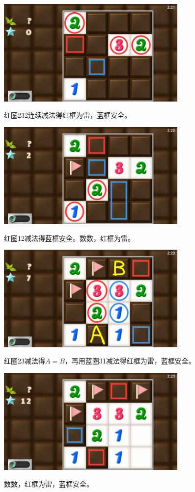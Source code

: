 \subsection{} %
\begin{center}
    \includegraphics[width=0.7\textwidth]{puzzle/145-1.png}
\end{center}
红圈232连续减法得红框为雷，蓝框安全。
\begin{center}
    \includegraphics[width=0.7\textwidth]{puzzle/145-2.png}
\end{center}
红圈12减法得蓝框安全。数数，红框为雷。
\begin{center}
    \includegraphics[width=0.7\textwidth]{puzzle/145-3.png}
\end{center}
红圈23减法得$A=B$，再用蓝圈31减法得红框为雷，蓝框安全。
\begin{center}
    \includegraphics[width=0.7\textwidth]{puzzle/145-4.png}
\end{center}
数数，红框为雷，蓝框安全。

